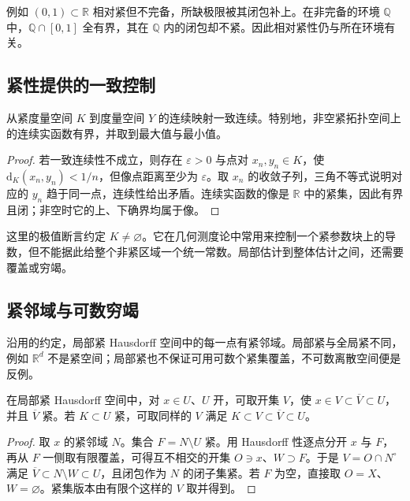 例如 \((0,1)\subset\mathbb R\) 相对紧但不完备，所缺极限被其闭包补上。在非完备的环境 \(\mathbb Q\) 中，\(\mathbb Q\cap[0,1]\) 全有界，其在 \(\mathbb Q\) 内的闭包却不紧。因此相对紧性仍与所在环境有关。

\subsection{紧性提供的一致控制}
\label{b1:subsec:A10202}

\begin{proposition}\label{b1:prop:app-heine-cantor}
从紧度量空间 \(K\) 到度量空间 \(Y\) 的连续映射一致连续。特别地，非空紧拓扑空间上的连续实函数有界，并取到最大值与最小值。
\end{proposition}
\begin{proof}
若一致连续性不成立，则存在 \(\varepsilon>0\) 与点对 \(x_n,y_n\in K\)，使 \(\mathrm{d}_K(x_n,y_n)<1/n\)，但像点距离至少为 \(\varepsilon\)。取 \(x_n\) 的收敛子列，三角不等式说明对应的 \(y_n\) 趋于同一点，连续性给出矛盾。连续实函数的像是 \(\mathbb R\) 中的紧集，因此有界且闭；非空时它的上、下确界均属于像。
\end{proof}

这里的极值断言约定 \(K\ne\varnothing\)。它在几何测度论中常用来控制一个紧参数块上的导数，但不能据此给整个非紧区域一个统一常数。局部估计到整体估计之间，还需要覆盖或穷竭。

\subsection{紧邻域与可数穷竭}
\label{b1:subsec:A10203}

沿用的约定，局部紧 Hausdorff 空间中的每一点有紧邻域。局部紧与全局紧不同，例如 \(\mathbb R^d\) 不是紧空间；局部紧也不保证可用可数个紧集覆盖，不可数离散空间便是反例。

\begin{lemma}\label{b1:lem:app-local-shrink}
在局部紧 Hausdorff 空间中，对 \(x\in U\)、\(U\) 开，可取开集 \(V\)，使 \(x\in V\subset\overline V\subset U\)，并且 \(\overline V\) 紧。若 \(K\subset U\) 紧，可取同样的 \(V\) 满足 \(K\subset V\subset\overline V\subset U\)。
\end{lemma}
\begin{proof}
取 \(x\) 的紧邻域 \(N\)。集合 \(F=N\setminus U\) 紧。用 Hausdorff 性逐点分开 \(x\) 与 \(F\)，再从 \(F\) 一侧取有限覆盖，可得互不相交的开集 \(O\ni x\)、\(W\supset F\)。于是 \(V=O\cap N^\circ\) 满足
\(\overline V\subset N\setminus W\subset U\)，且闭包作为 \(N\) 的闭子集紧。若 \(F\) 为空，直接取 \(O=X\)、\(W=\varnothing\)。紧集版本由有限个这样的 \(V\) 取并得到。
\end{proof}

